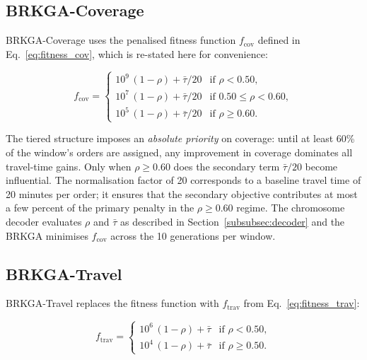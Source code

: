\subsection{BRKGA-Coverage}
\label{subsec:brkga_cov}

BRKGA-Coverage uses the penalised fitness function $f_{\text{cov}}$
defined in Eq.~\eqref{eq:fitness_cov}, which is re-stated here for
convenience:

\begin{equation*}
    f_{\text{cov}} =
    \begin{cases}
        10^{9}\,(1 - \rho) + \bar{\tau}/20 & \text{if } \rho < 0.50, \\
        10^{7}\,(1 - \rho) + \bar{\tau}/20 & \text{if } 0.50 \leq \rho < 0.60, \\
        10^{5}\,(1 - \rho) + \bar{\tau}/20 & \text{if } \rho \geq 0.60.
    \end{cases}
\end{equation*}

The tiered structure imposes an \emph{absolute priority} on coverage:
until at least 60\% of the window's orders are assigned, any
improvement in coverage dominates all travel-time gains.
Only when $\rho \geq 0.60$ does the secondary term $\bar{\tau}/20$
become influential.
The normalisation factor of 20 corresponds to a baseline travel
time of 20 minutes per order; it ensures that the secondary
objective contributes at most a few percent of the primary
penalty in the $\rho \geq 0.60$ regime.
The chromosome decoder evaluates $\rho$ and $\bar{\tau}$ as
described in Section~\ref{subsubsec:decoder} and the BRKGA
minimises $f_{\text{cov}}$ across the 10 generations per window.

\subsection{BRKGA-Travel}
\label{subsec:brkga_trav}

BRKGA-Travel replaces the fitness function with $f_{\text{trav}}$
from Eq.~\eqref{eq:fitness_trav}:

\begin{equation*}
    f_{\text{trav}} =
    \begin{cases}
        10^{6}\,(1 - \rho) + \bar{\tau} & \text{if } \rho < 0.50, \\
        10^{4}\,(1 - \rho) + \bar{\tau} & \text{if } \rho \geq 0.50.
    \end{cases}
\end{equation*}

